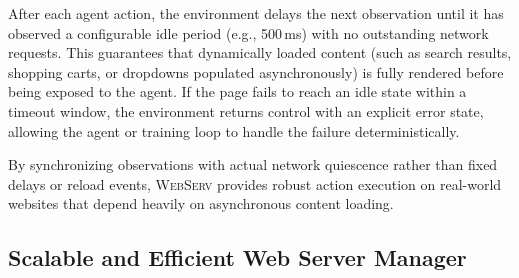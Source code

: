 \documentclass{article}
\DeclareRobustCommand{\projectname}{\textsc{WebServ}\xspace}
\begin{document}
After each agent action, the environment delays the next observation until it has observed a configurable idle period (e.g., 500\,ms) with no outstanding network requests. This guarantees that dynamically loaded content (such as search results, shopping carts, or dropdowns populated asynchronously) is fully rendered before being exposed to the agent. If the page fails to reach an idle state within a timeout window, the environment returns control with an explicit error state, allowing the agent or training loop to handle the failure deterministically.

By synchronizing observations with actual network quiescence rather than fixed delays or reload events, \projectname provides robust action execution on real-world websites that depend heavily on asynchronous content loading.

\subsection{Scalable and Efficient Web Server Manager}



\end{document}

